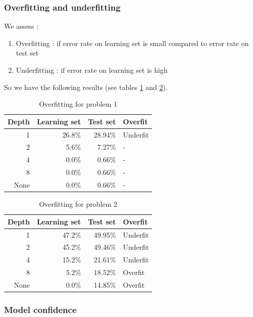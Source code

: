 \documentclass{article}
\begin{document}
\subsubsection{Overfitting and underfitting}

We assess :
\begin{enumerate}
\item Overfitting : if error rate on learning set is small compared to error rate on test set
\item Underfitting : if error rate on learning set is high
\end{enumerate}

So we have the following results (see tables \ref{overfitting1} and \ref{overfitting2}).

\begin{table}[h]
  \centering
	\begin{tabular}{rrrl}
	      \textbf{Depth} & \textbf{Learning set} & \textbf{Test set} & \textbf{Overfit} \\
	      \hline
	      1 & 26.8\% & 28.94\% & Underfit \\
2 & 5.6\% & 7.27\% & - \\
4 & 0.0\% & 0.66\% & - \\
8 & 0.0\% & 0.66\% & - \\
None & 0.0\% & 0.66\% & - \\
	\end{tabular}
  \caption{\label{overfitting1}Overfitting for problem 1}
\end{table}
	
\begin{table}[h]
  \centering
	\begin{tabular}{rrrl}
	      \textbf{Depth} & \textbf{Learning set} & \textbf{Test set} & \textbf{Overfit} \\
	      \hline
    1 & 47.2\% & 49.95\% & Underfit \\
2 & 45.2\% & 49.46\% & Underfit \\
4 & 15.2\% & 21.61\% & Underfit \\
8 & 5.2\% & 18.52\% & Overfit \\
None & 0.0\% & 14.85\% & Overfit \\

	\end{tabular}
  \caption{\label{overfitting2}Overfitting for problem 2}
\end{table}


\subsubsection{Model confidence}
\end{document}
